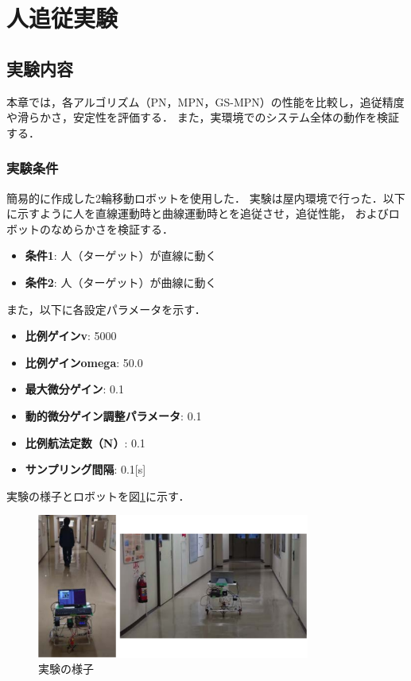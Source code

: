 \section{人追従実験}

\subsection{実験内容}
本章では，各アルゴリズム（PN，MPN，GS-MPN）の性能を比較し，追従精度や滑らかさ，安定性を評価する．
また，実環境でのシステム全体の動作を検証する．

\subsubsection{実験条件}
簡易的に作成した2輪移動ロボットを使用した．
実験は屋内環境で行った．以下に示すように人を直線運動時と曲線運動時とを追従させ，追従性能，
およびロボットのなめらかさを検証する．
\begin{itemize}
    \item \textbf{条件1}: 人（ターゲット）が直線に動く
    \item \textbf{条件2}: 人（ターゲット）が曲線に動く
\end{itemize}

また，以下に各設定パラメータを示す．

\begin{itemize}
    \item \textbf{比例ゲインv}: 5000
    \item \textbf{比例ゲインomega}: 50.0
    \item \textbf{最大微分ゲイン}: 0.1
    \item \textbf{動的微分ゲイン調整パラメータ}: 0.1
    \item \textbf{比例航法定数（N）}: 0.1
    \item \textbf{サンプリング間隔}: 0.1[s]
\end{itemize}

実験の様子とロボットを図\ref{fig:robo}に示す．

\begin{figure}[H]
    \centering
    \includegraphics[width=0.8\textwidth]{figure/robo.pdf}
    \caption{実験の様子}
    \label{fig:robo}
\end{figure}

